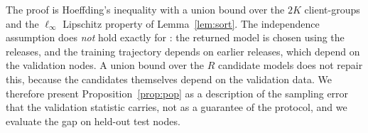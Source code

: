 The proof is Hoeffding's inequality with a union bound over the $2K$ client-groups and the $\ell_\infty$ Lipschitz property of Lemma~\ref{lem:sort}. The independence assumption does \emph{not} hold exactly for \rt{}: the returned model is chosen using the releases, and the training trajectory depends on earlier releases, which depend on the validation nodes. A union bound over the $R$ candidate models does not repair this, because the candidates themselves depend on the validation data. We therefore present Proposition~\ref{prop:pop} as a description of the sampling error that the validation statistic carries, not as a guarantee of the protocol, and we evaluate the gap on held-out test nodes. 
